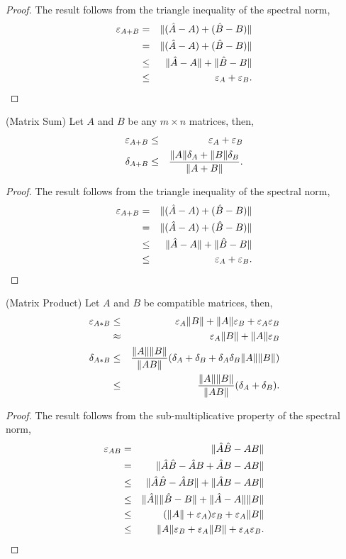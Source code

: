 \begin{proof}
  The result follows from the triangle inequality of the spectral norm,
  \begin{eqnarray}
    \varepsilon_{ A+B } 
      &=& \| (\hat{A} - A) + (\hat{B} - B) \| \\
      &=& \| (\hat{A} - A) + (\hat{B} - B) \| \\
      &\le& \| \hat{A} - A \| + \| \hat{B} - B \| \\
      &\le& \varepsilon_{A} + \varepsilon_{B}.
  \end{eqnarray}
\end{proof}

\begin{proposition}(Matrix Sum)
  \label{prop:sum}
  Let $A$ and $B$ be any $m \times n$ matrices, then, 
  \begin{eqnarray}
    \varepsilon_{A+B} &\le& \varepsilon_{A} + \varepsilon_{B} \\
    \delta_{A+B} &\le& \frac{\|A\|\delta_{A} + \|B\|\delta_{B}}{\|A+B\|}.
  \end{eqnarray}
\end{proposition}
\begin{proof}
  The result follows from the triangle inequality of the spectral norm,
  \begin{eqnarray}
    \varepsilon_{ A+B } 
      &=& \| (\hat{A} - A) + (\hat{B} - B) \| \\
      &=& \| (\hat{A} - A) + (\hat{B} - B) \| \\
      &\le& \| \hat{A} - A \| + \| \hat{B} - B \| \\
      &\le& \varepsilon_{A} + \varepsilon_{B}.
  \end{eqnarray}
\end{proof}

\begin{proposition}(Matrix Product)
  \label{prop:prod}
  Let $A$ and $B$ be compatible matrices, then, 
  \begin{eqnarray}
    \varepsilon_{A*B} &\le& \varepsilon_{A} \|B\| + \|A\| \varepsilon_{B} + \varepsilon_{A} \varepsilon_{B} \\
               &\approx& \varepsilon_{A} \|B\| + \|A\| \varepsilon_{B} \\
   \delta_{A*B} &\le& \frac{\|A\|\|B\|}{\|AB\|} (\delta_{A} + \delta_{B} + \delta_{A}\delta_{B} \|A\|\|B\|) \\
              &\le& \frac{\|A\|\|B\|}{\|AB\|} (\delta_{A} + \delta_{B}).
  \end{eqnarray}
\end{proposition}
\begin{proof}
  The result follows from the sub-multiplicative property of the
  spectral norm,
  \begin{eqnarray}
    \varepsilon_{ A B } 
      &=& \| \hat{A} \hat{B} - A B \| \\
      &=& \| \hat{A} \hat{B} - \hat{A} B + \hat{A} B - A B \| \\
      &\le& \| \hat{A} \hat{B} - \hat{A} B \|  + \| \hat{A} B - A B \| \\
      &\le& \| \hat{A} \| \| \hat{B} - B \|  + \| \hat{A} - A \| \| B \| \\
      &\le& (\|A\| + \varepsilon_{A}) \varepsilon_{B} + \varepsilon_{A} \| B \| \\
      &\le& \|A\| \varepsilon_{B} + \varepsilon_{A} \|B\| + \varepsilon_{A} \varepsilon_{B}.
  \end{eqnarray}
\end{proof}

